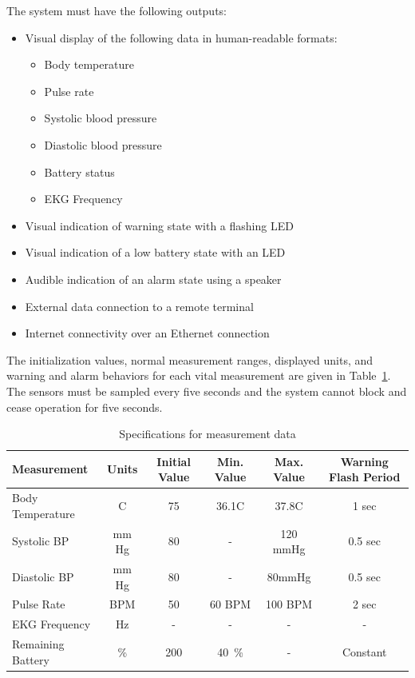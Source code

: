 \documentclass[12pt]{article} %
\begin{document}
\begin{itemize}[$$]
  \item The system must have the following outputs:
		\begin{itemize}[$\bullet$]
			\item Visual display of the following data in human-readable formats:
				\begin{itemize}
					\item Body temperature
					\item Pulse rate
					\item Systolic blood pressure
					\item Diastolic blood pressure
					\item Battery status
					\item EKG Frequency
	\end{itemize}
      \item Visual indication of warning state with a flashing LED
      \item Visual indication of a low battery state with an LED
      \item Audible indication of an alarm state using a speaker
      \item External data connection to a remote terminal
			\item Internet connectivity over an Ethernet connection
    \end{itemize}
\end{itemize}

The initialization values, normal measurement ranges, displayed units, and 
warning and alarm behaviors for each vital measurement are given in 
Table~\ref{tab:sensorDefs}. The sensors must be sampled every five seconds and the system cannot block and cease operation for five seconds.

\begin{table}[h]
  \centering
  \begin{tabular}{|l|*{5}{c}|}
    \hline
    Measurement & Units & Initial Value & Min. Value & Max. Value & Warning Flash Period \\ \hline
    Body Temperature & C & 75 & 36.1C & 37.8C & 1 sec \\ \hline
    Systolic BP & mm Hg & 80 & - & 120 mmHg & 0.5 sec \\ \hline
    Diastolic BP & mm Hg & 80 & - & 80mmHg & 0.5 sec \\ \hline
    Pulse Rate & BPM & 50 & 60 BPM & 100 BPM & 2 sec \\ \hline
		EKG Frequency & Hz & - & - & - & - \\ \hline
    Remaining Battery & \% & 200 & 40~\% & - & Constant \\ \hline
  \end{tabular}
  \caption{Specifications for measurement data}
  \label{tab:sensorDefs}
\end{table}
\end{document}
